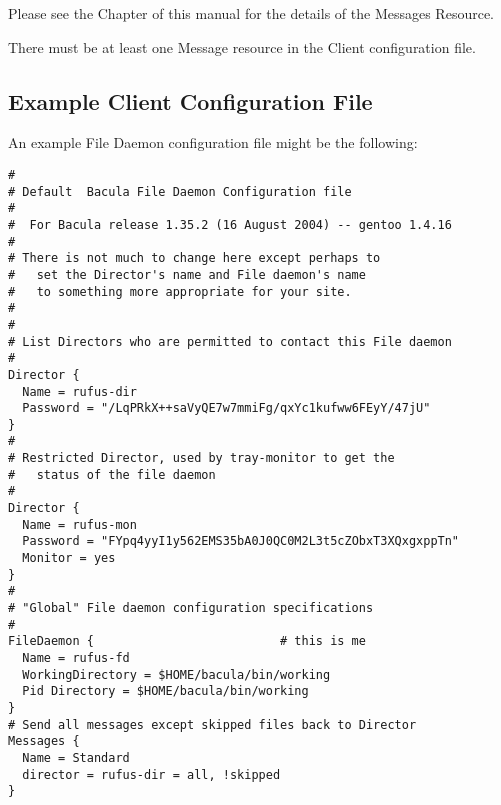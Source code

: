 Please see the 
 Chapter of this
manual for the details of the Messages Resource. 

There must be at least one Message resource in the Client configuration file. 

\subsection*{Example Client Configuration File}
\label{SampleClientConfiguration}

An example File Daemon configuration file might be the following: 

\footnotesize
\begin{verbatim}
#
# Default  Bacula File Daemon Configuration file
#
#  For Bacula release 1.35.2 (16 August 2004) -- gentoo 1.4.16
#
# There is not much to change here except perhaps to
#   set the Director's name and File daemon's name
#   to something more appropriate for your site.
#
#
# List Directors who are permitted to contact this File daemon
#
Director {
  Name = rufus-dir
  Password = "/LqPRkX++saVyQE7w7mmiFg/qxYc1kufww6FEyY/47jU"
}
#
# Restricted Director, used by tray-monitor to get the
#   status of the file daemon
#
Director {
  Name = rufus-mon
  Password = "FYpq4yyI1y562EMS35bA0J0QC0M2L3t5cZObxT3XQxgxppTn"
  Monitor = yes
}
#
# "Global" File daemon configuration specifications
#
FileDaemon {                          # this is me
  Name = rufus-fd
  WorkingDirectory = $HOME/bacula/bin/working
  Pid Directory = $HOME/bacula/bin/working
}
# Send all messages except skipped files back to Director
Messages {
  Name = Standard
  director = rufus-dir = all, !skipped
}
\end{verbatim}
\normalsize
